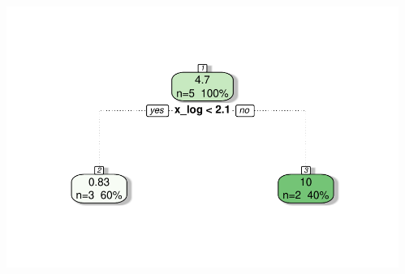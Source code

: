 \begin{frame}
\begin{columns}[T]
\begin{knitrout}
\end{knitrout}
\includegraphics[width = \textwidth]{figure/cart_splitcomp_2}
\end{columns}
\vspace{0.5cm}
\centering
\end{frame}

